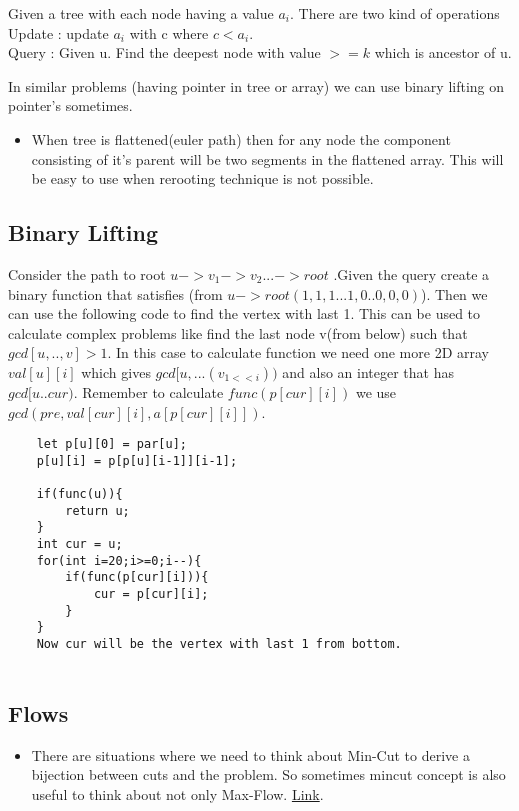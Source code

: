 \documentclass[../Notes.tex]{subfiles}
\begin{document}
Given a tree with each node having a value $a_{i}$. There are two kind of operations\\
Update : update $a_{i}$ with c where $c<a_{i}$.\\
Query : Given u. Find the deepest node with value $>= k$ which is ancestor of u.

In similar problems (having pointer in tree or array) we can use binary lifting on pointer's sometimes.\\

\begin{itemize}
	\item When tree is flattened(euler path) then for any node the component consisting of it's parent will be two segments in the flattened array. This will be easy to use when rerooting technique is not possible.
\end{itemize}

\subsection{Binary Lifting}
Consider the path to root $u->v_1->v_2...->root$ .Given the query create a binary function that satisfies (from $u -> root (1,1,1...1,0..0,0,0)$). Then we can use the following code to find the vertex with last 1. This can be used to calculate complex problems like find the last node v(from below) such that $gcd[u,..,v]>1$. In this case to calculate function we need one more 2D array $val[u][i]$ which gives $gcd[u,...(v_{1<<i}))$ and also an integer that has $gcd[u..cur)$. Remember to calculate $func(p[cur][i])$ we use $gcd(pre,val[cur][i],a[p[cur][i]])$.

\begin{lstlisting}
	let p[u][0] = par[u];
	p[u][i] = p[p[u][i-1]][i-1];
	
	if(func(u)){
		return u;
	}
	int cur = u;
	for(int i=20;i>=0;i--){
		if(func(p[cur][i])){
			cur = p[cur][i];		
		}	
	}
	Now cur will be the vertex with last 1 from bottom.	
	   		
\end{lstlisting}

\subsection{Flows}
\begin{itemize}
	\item There are situations where we need to think about Min-Cut to derive a bijection between cuts and the problem. So sometimes mincut concept is also useful to think about not only Max-Flow. \href{https://atcoder.jp/contests/abc225/tasks/abc225_g}{Link}.

\end{itemize}
\end{document}
